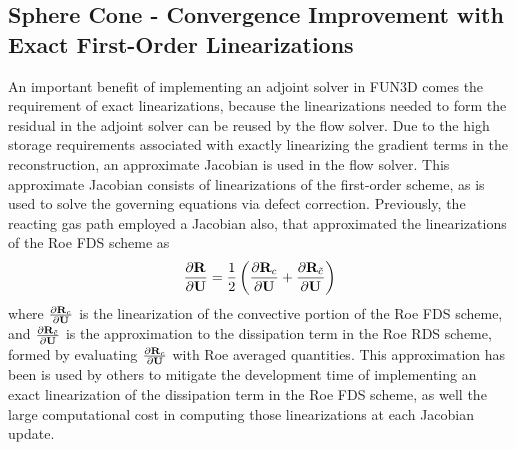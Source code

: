 \subsection{Sphere Cone - Convergence Improvement with Exact First-Order Linearizations}
\label{sec:sphere-cone-exact-approx-convergence}

An important benefit of implementing an adjoint solver in FUN3D comes the
requirement of exact linearizations, because the linearizations needed to form
the residual in the adjoint solver can be reused by the flow solver.
Due to the high storage requirements associated with exactly linearizing the
gradient terms in the reconstruction, an approximate Jacobian is used in the
flow solver.  This approximate Jacobian consists of linearizations of the
first-order scheme, as is used to solve the governing equations via defect
correction.  Previously, the reacting gas path employed a Jacobian also, that
approximated the linearizations of the Roe FDS scheme\cite{gnoffo-tp} as
\begin{equation}
  \frac{\partial \mathbf R_{}}{\partial \mathbf U} = 
  \frac{1}{2} \left( \frac{\partial \mathbf R_{c}}{\partial \mathbf U} + \frac{\partial \mathbf R_{\tilde{c}}}{\partial \mathbf U} \right)
  \label{approx-roe-jac}
\end{equation}
where $\frac{\partial \mathbf R_{c}}{\partial \mathbf U}$ is the linearization of the convective portion of the Roe
FDS scheme, and $\frac{\partial \mathbf R_{\tilde{c}}}{\partial \mathbf U}$ is the approximation to the dissipation
term in the Roe RDS scheme, formed by evaluating $\frac{\partial \mathbf R_{c}}{\partial \mathbf U}$ with Roe
averaged quantities.  This approximation has been is used by others
\cite{rinaldi2014exact} to mitigate the development time of implementing an
exact linearization of the dissipation term in the Roe FDS scheme, as well the
large computational cost in computing those linearizations at each Jacobian
update.

